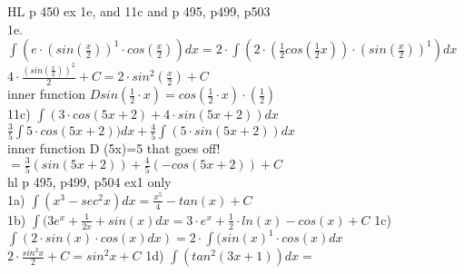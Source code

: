 \documentclass{article}
\begin{document}
  HL p 450 ex 1e, and 11c and p 495, p499, p503\\
  
  1e. $\int (e\cdot (sin(\frac{x}{2}))^1\cdot cos(\frac{x}{2}))dx=2\cdot \int(2\cdot(\frac{1}{2}cos(\frac{1}{2}x))\cdot (sin(\frac{x}{2}))^1)dx$\\
  $4\cdot \frac{(sin(\frac{x}{2}))^2}{2}+C=2\cdot sin^2(\frac{x}{2})+C$\\
  inner function $D sin(\frac{1}{2}\cdot x)=cos(\frac{1}{2}\cdot x)\cdot(\frac{1}{2})$\\
  11c) $\int(3\cdot cos(5x+2)+4\cdot sin(5x+2))dx$\\
  $\frac{3}{5}\int 5\cdot cos(5x+2))dx+ \frac{4}{5}\int(5\cdot sin(5x+2))dx$\\
  inner function D (5x)=5 that goes off!\\
  $=\frac{3}{5}(sin(5x+2))+\frac{4}{5}(-cos(5x+2))+C$\\
  hl p 495, p499, p504 ex1 only\\
  1a) $\int(x^3-sec^2x)dx=\frac{x^5}{4}-tan(x)+C$\\
  1b) $\int (3e^x+\frac{1}{2x}+sin(x)dx=3\cdot e^x+\frac{1}{2}\cdot ln(x)-cos(x)+C$
  1c) $\int (2\cdot sin(x)\cdot cos(x)dx)= 2\cdot \int(sin(x)^1\cdot cos(x)dx$\\
  $2\cdot \frac{sin^2x}{2}+C=sin^2x+C$
  1d) $\int(tan^2(3x+1))dx=$

   
\end{document}
